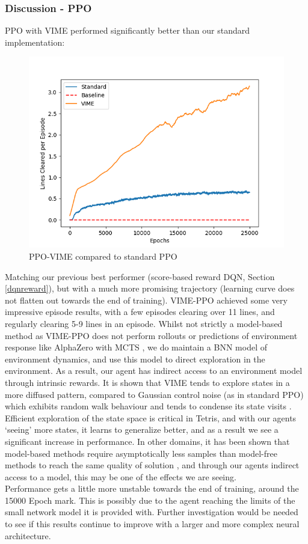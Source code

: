 \documentclass[12pt]{article}
\begin{document}
\subsubsection{Discussion - PPO}
PPO with VIME performed significantly better than our standard implementation: 
\begin{figure}[H]
    \centering
    \includegraphics[scale=0.7]{32.png}
    \caption{PPO-VIME compared to standard PPO}
\end{figure}
Matching our previous best performer (score-based reward DQN, Section \ref{dqnreward}), but with a much more promising trajectory (learning curve does not flatten out towards the end of training). VIME-PPO achieved some very impressive episode results, with a few episodes clearing over 11 lines, and regularly clearing 5-9 lines in an episode. Whilst not strictly a model-based method as VIME-PPO does not perform rollouts or predictions of environment response like AlphaZero with MCTS \autocite{Silver2017}, we do maintain a BNN model of environment dynamics, and use this model to direct exploration in the environment. As a result, our agent has indirect access to an environment model through intrinsic rewards. It is shown that VIME tends to explore states in a more diffused pattern, compared to Gaussian control noise (as in standard PPO) which exhibits random walk behaviour and tends to condense its state visits \autocite{houthooft2016vime}. Efficient exploration of the state space is critical in Tetris, and with our agents `seeing' more states, it learns to generalize better, and as a result we see a significant increase in performance. In other domains, it has been shown that model-based methods require asymptotically less samples than model-free methods to reach the same quality of solution \autocite{pmlr-v99-tu19a}, and through our agents indirect access to a model, this may be one of the effects we are seeing. \\\newline
Performance gets a little more unstable towards the end of training, around the 15000 Epoch mark. This is possibly due to the agent reaching the limits of the small network model it is provided with. Further investigation would be needed to see if this results continue to improve with a larger and more complex neural architecture. 
\end{document}
